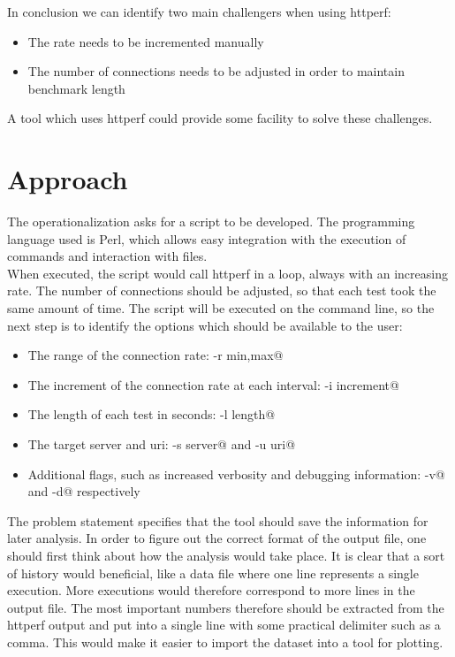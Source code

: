 In conclusion we can identify two main challengers when using httperf: 
\begin{itemize}
	\item The rate needs to be incremented manually
	\item The number of connections needs to be adjusted in order to maintain benchmark length
\end{itemize}

A tool which uses httperf could provide some facility to solve these challenges.

\section*{Approach}

The operationalization asks for a script to be developed. The programming language used is Perl, which allows easy integration with the execution of commands and interaction with files.\\

When executed, the script would call httperf in a loop, always with an increasing rate. The number of connections should be adjusted, so that each test took the same amount of time. 
The script will be executed on the command line, so the next step is to identify the options which should be available to the user: 

\begin{itemize}
	\item The range of the connection rate: \Verb@-r min,max@
	\item The increment of the connection rate at each interval: \Verb@-i increment@
	\item The length of each test in seconds: \Verb@-l length@
	
	\item The target server and uri: \Verb@-s server@ and \Verb@-u uri@ 
	\item Additional flags, such as increased verbosity and debugging information: \Verb@-v@ and \Verb@-d@ respectively
\end{itemize}

The problem statement specifies that the tool should save the information for later analysis. In order to figure out the correct format of the output file, one should first think about how the analysis would take place. It is clear that a sort of history would beneficial, like a data file where one line represents a single execution. More executions would therefore correspond to more lines in the output file. The most important numbers therefore should be extracted from the httperf output and put into a single line with some practical delimiter such as a comma. This would make it easier to import the dataset into a tool for plotting.

